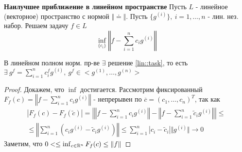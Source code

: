 \begin{ticket}
  \textbf{Наилучшее приближение в линейном пространстве}
  Пусть $L$ - линейное (векторное) пространство с нормой $\Vert\doteq\Vert$.
  Пусть $\{g^{(i)}\},\ i=1,\ldots,n$ - лин. нез. набор.
  Решаем задачу $f\in L$
  \begin{equation}\label{lin::task}
    \inf_{\{c_i\}}\left\Vert f-\sum_{i=1}^nc_ig^{(i)}\right\Vert
  \end{equation}
  \begin{theorem}
    В линейном полном норм. пр-ве $\exists$ решение \eqref{lin::task}, то есть $\exists\ g^f=\sum_{i=1}^nc_i^fg^{(i)},\ g^f\in<g^{(1)},\ldots,g^{(n)}>$
  \end{theorem}
  \begin{proof}
    Докажем, что $\inf$ достигается.
    Рассмотрим фиксированный $F_f(c)=\left\Vert f-\sum_{i=1}^nc_ig^{(i)}\right\Vert$ - непрерывен по $\overline{c}=(c_1,\ldots,c_n)^T$, так как
    \begin{multline*}
      \left|F_f(c)-F_f(\tilde{c})\right|=\left|\left\Vert f-\sum_{i=1}^nc_ig^{(i)}\right\Vert-\left\Vert f-\sum_{i=1}^n\tilde{c}_ig^{(i)}\right\Vert\right|\leq\\
      \leq \left\Vert \sum_{i=1}^n(c_ig^{(i)}-\tilde{c}_ig^{(i)})\right\Vert\leq\sum_{i=1}^n\left|c_i-\tilde{c}_i\right|\Vert g^{(i)}\Vert\rightarrow0
    \end{multline*}
    Заметим, что $0<\leq\inf_{c\in\mathbb{R}^n}F_f(c)\leq\Vert f\Vert$
  \end{proof}


\end{ticket}

